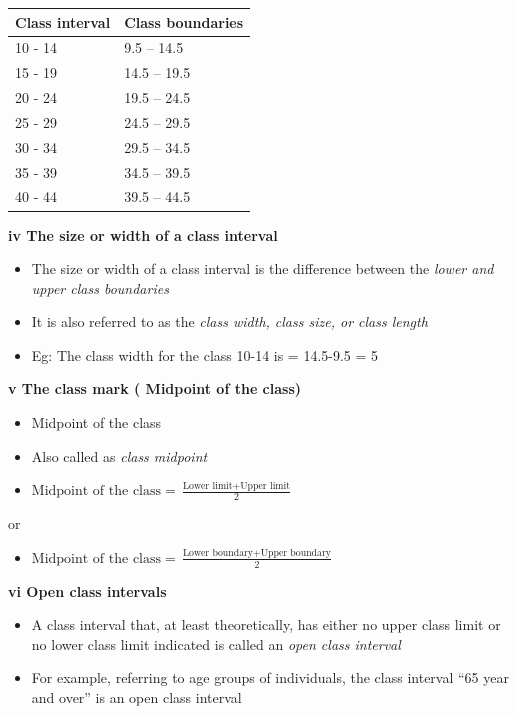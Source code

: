 \documentclass[]{book}
\providecommand{\tightlist}{%
  \setlength{\itemsep}{0pt}\setlength{\parskip}{0pt}}
\begin{document}
\begin{longtable}[]{@{}ll@{}}
\toprule
Class interval & Class boundaries\tabularnewline
\midrule
\endhead
10 - 14 & 9.5 -- 14.5\tabularnewline
15 - 19 & 14.5 -- 19.5\tabularnewline
20 - 24 & 19.5 -- 24.5\tabularnewline
25 - 29 & 24.5 -- 29.5\tabularnewline
30 - 34 & 29.5 -- 34.5\tabularnewline
35 - 39 & 34.5 -- 39.5\tabularnewline
40 - 44 & 39.5 -- 44.5\tabularnewline
\bottomrule
\end{longtable}

\textbf{iv The size or width of a class interval}

\begin{itemize}
\tightlist
\item
  The size or width of a class interval is the difference between the \emph{lower and upper class boundaries}
\item
  It is also referred to as the \emph{class width, class size, or class length}
\item
  Eg: The class width for the class 10-14 is = 14.5-9.5 = 5
\end{itemize}

\textbf{v The class mark ( Midpoint of the class)}

\begin{itemize}
\tightlist
\item
  Midpoint of the class
\item
  Also called as \emph{class midpoint}
\item
  \(\text{Midpoint of the class} = \frac{\text{Lower limit} + \text{Upper limit}}{2}\)
\end{itemize}

or

\begin{itemize}
\tightlist
\item
  \(\text{Midpoint of the class} = \frac{\text{Lower boundary} + \text{Upper boundary}}{2}\)
\end{itemize}

\textbf{vi Open class intervals}

\begin{itemize}
\item
  A class interval that, at least theoretically, has either no upper class limit or no lower class limit indicated is called an \emph{open class interval}
\item
  For example, referring to age groups of individuals, the class interval ``65 year and over'' is an open class interval
\end{itemize}
\end{document}
